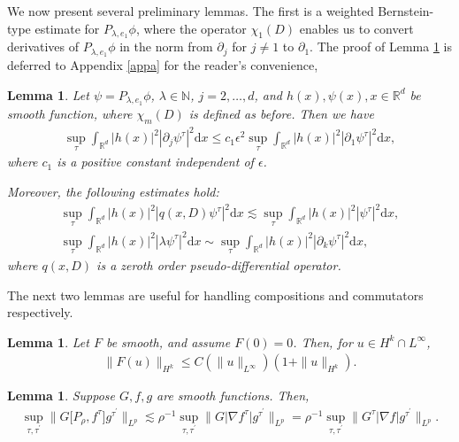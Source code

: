 \documentclass[10pt,twoside,a4paper]{article}
\newtheorem{lem}[thm]{Lemma}
\numberwithin{equation}{section}\allowdisplaybreaks
\def\leq{\leqslant}
\begin{document}
We now present several preliminary lemmas. The first is a weighted Bernstein-type estimate for \(P_{\lambda, e_1} \phi\), where the operator \(\chi_1(D)\) enables us to convert derivatives of \(P_{\lambda, e_1} \phi\) in the norm from \(\partial_j\) for \(j \neq 1\) to \(\partial_1\). The proof of Lemma \ref{lem_transf_k} is deferred to Appendix \ref{appa} for the reader’s convenience, 
\begin{lem}  \label{lem_transf_k}
	Let $   \psi =  P_{\lambda, e_1}  \phi$, $ \lambda \in \mathbb{N}$, $ j=2,\dots ,d  $,   and  $ h(x), \psi(x), x\in \mathbb{R}^d $ be smooth function, where $ \chi_m(D) $ is defined as before. Then we have
	\begin{align}
		\sup_{\tau} \int_{\mathbb{R}^{d}} \left| h(x) \right|^2 \left| \partial_j \psi^\tau    \right|^2   \mathrm{d} x  	\leq c_1 \epsilon^2	\sup_{\tau}   \int_{\mathbb{R}^{d}} \left| h(x) \right|^2 \left| \partial_1 \psi^\tau    \right|^2   \mathrm{d} x,   \label{est_transf_k}
	\end{align}
	where $ c_1 $ is a positive constant  independent of \(\epsilon\). 
	
	
	Moreover, the following estimates hold:
	\begin{align}
		\sup_{\tau} \int_{\mathbb{R}^{d}} \left| h(x) \right|^2 \left| q(x,D) \psi^\tau    \right|^2   \mathrm{d} x  	\lesssim	\sup_{\tau}   \int_{\mathbb{R}^{d}} \left| h(x) \right|^2 \left|  \psi^\tau    \right|^2   \mathrm{d} x,  \label{est_transf_0_order_P}\\
		\sup_{\tau} \int_{\mathbb{R}^{d}} \left| h(x) \right|^2 \left| \lambda \psi^\tau    \right|^2   \mathrm{d} x  	\sim	\sup_{\tau}   \int_{\mathbb{R}^{d}} \left| h(x) \right|^2 \left|  \partial_k \psi^\tau    \right|^2   \mathrm{d} x,  \label{est_transf_k2}
	\end{align}
	where   $ q(x,D) $ is a zeroth order pseudo-differential operator.
\end{lem}

The next two lemmas are useful for handling compositions and commutators respectively.
\begin{lem} \label{Lem_phi_infty} \cite{taylor1996partial}
	Let $F$ be smooth, and assume $F(0)=0$. Then, for $u \in H^k \cap L^{\infty}$,
	\begin{align} \label{big_a_inf}
		\|F(u)\|_{H^k} \leq C \left(\|u\|_{L^{\infty}}\right)\left(1+\|u\|_{H^k}\right).
	\end{align}
\end{lem}
\begin{lem} \cite{lai2025global}\label{lem_com}
	Suppose  $ G,f,g $ are smooth functions. Then,
	\begin{align}
		\sup_{\tau, \tau^\prime} \Big\| G\big[P_\rho,f^\tau\big] g^{\tau^\prime}\Big\|_{L^p} \lesssim \rho^{-1} 	\sup_{\tau, \tau^\prime} \Big\| G\big|\nabla f^\tau\big| g^{\tau^\prime}\Big\|_{L^p}= \rho^{-1} 	\sup_{\tau, \tau^\prime} \Big\| G^\tau\big|\nabla f\big| g^{\tau^\prime}\Big\|_{L^p}. 
	\end{align}
\end{lem}
\end{document}
